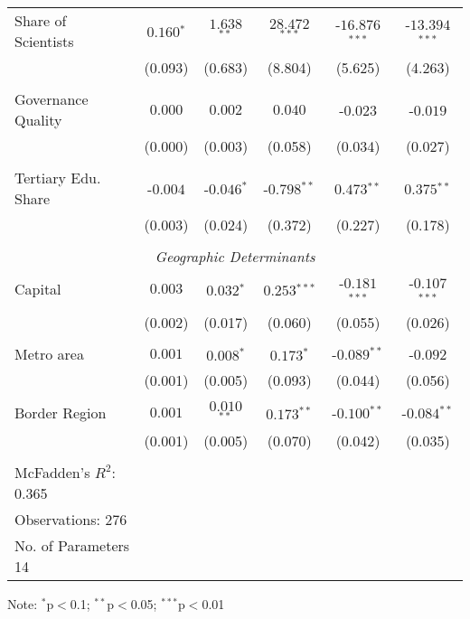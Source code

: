 \documentclass[11pt]{article}
\begin{document}
\begin{table}[!htbp]
{\begin{minipage}{\textwidth}
\begin{tabular}{@{\extracolsep{5pt}} lccccc}
Share of Scientists & $0.160$$^{*}$ & $1.638$$^{**}$ & $28.472$$^{***}$ & $ $-$16.876$$^{***}$ & $ $-$13.394$$^{***}$ \\
& (0.093) &  (0.683) & (8.804) & (5.625) & (4.263)\\
&\\
Governance Quality & $0.000$ & $0.002$ & $0.040$ & $ $-$0.023$ & $ $-$0.019$ \\
& (0.000) &  (0.003) & (0.058) & (0.034) & (0.027)\\
&\\
Tertiary Edu. Share & $ $-$0.004$ & $ $-$0.046$$^{*}$ & $ $-$0.798$$^{**}$ & $0.473$$^{**}$ & $0.375$$^{**}$ \\
& (0.003) &  (0.024) & (0.372) & (0.227) & (0.178)\\
&\\
\multicolumn{6}{c}{\textit{Geographic Determinants}}\\

Capital & $0.003$ & $0.032$$^{*}$ & $0.253$$^{***}$ & $ $-$0.181$$^{***}$ & $ $-$0.107$$^{***}$ \\
& (0.002) &  (0.017) & (0.060) & (0.055) & (0.026)\\
&\\
Metro area & $0.001$ & $0.008$$^{*}$ & $0.173$$^{*}$ & $ $-$0.089$$^{**}$ & $ $-$0.092$ \\ 
& (0.001) &  (0.005) & (0.093) & (0.044) & (0.056)\\
&\\
Border Region & $0.001$ & $0.010$$^{**}$ & $0.173$$^{**}$ & $ $-$0.100$$^{**}$ & $ $-$0.084$$^{**}$ \\ 
& (0.001) &  (0.005) & (0.070) & (0.042) & (0.035)\\

\hline \hline \\[-1.8ex]
McFadden's $R^{2}$: 0.365 \\
Observations: 276\\
No. of Parameters 14\\
\hline
\end{tabular}
\begin{tablenotes}
\small 
\item Note: $^{*}$p$<$0.1; $^{**}$p$<$0.05; $^{***}$p$<$0.01
\end{tablenotes}
\end{minipage}}
\end{table} 
\end{document}
